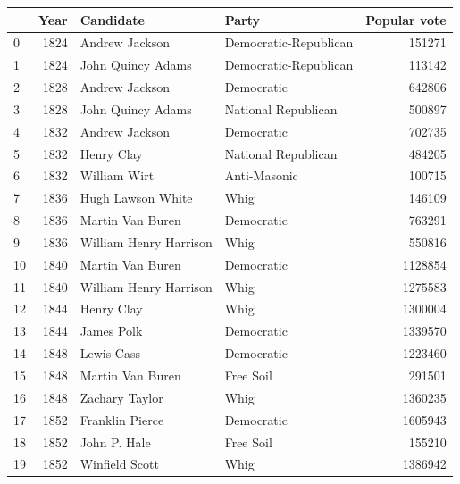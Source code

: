 \documentclass[
  letterpaper,
  DIV=11,
  numbers=noendperiod]{scrreprt}
\begin{document}
\begin{tabular}{lrllr}
\toprule
{} &  Year &               Candidate &                  Party &  Popular vote \\
\midrule
0   &  1824 &          Andrew Jackson &  Democratic-Republican &        151271 \\
1   &  1824 &       John Quincy Adams &  Democratic-Republican &        113142 \\
2   &  1828 &          Andrew Jackson &             Democratic &        642806 \\
3   &  1828 &       John Quincy Adams &    National Republican &        500897 \\
4   &  1832 &          Andrew Jackson &             Democratic &        702735 \\
5   &  1832 &              Henry Clay &    National Republican &        484205 \\
6   &  1832 &            William Wirt &           Anti-Masonic &        100715 \\
7   &  1836 &       Hugh Lawson White &                   Whig &        146109 \\
8   &  1836 &        Martin Van Buren &             Democratic &        763291 \\
9   &  1836 &  William Henry Harrison &                   Whig &        550816 \\
10  &  1840 &        Martin Van Buren &             Democratic &       1128854 \\
11  &  1840 &  William Henry Harrison &                   Whig &       1275583 \\
12  &  1844 &              Henry Clay &                   Whig &       1300004 \\
13  &  1844 &              James Polk &             Democratic &       1339570 \\
14  &  1848 &              Lewis Cass &             Democratic &       1223460 \\
15  &  1848 &        Martin Van Buren &              Free Soil &        291501 \\
16  &  1848 &          Zachary Taylor &                   Whig &       1360235 \\
17  &  1852 &         Franklin Pierce &             Democratic &       1605943 \\
18  &  1852 &            John P. Hale &              Free Soil &        155210 \\
19  &  1852 &          Winfield Scott &                   Whig &       1386942 \\

\end{tabular}
\end{document}
